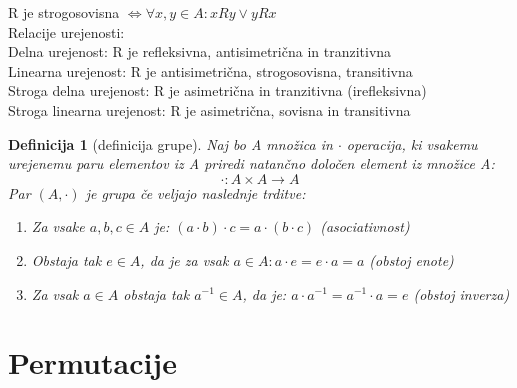 \documentclass[a4paper, 12pt]{book}
\newtheorem{definicija}{Definicija}[chapter]
\begin{document}
R je strogosovisna $\Leftrightarrow \forall x,y\in A: xRy \lor yRx $\\
Relacije urejenosti: \\
Delna urejenost: R je refleksivna, antisimetrična in tranzitivna \\
Linearna urejenost: R je antisimetrična, strogosovisna, transitivna \\ 
Stroga delna urejenost: R je asimetrična in tranzitivna (irefleksivna)  \\
Stroga linearna urejenost: R je asimetrična, sovisna in transitivna  \\


\begin{definicija}[definicija grupe]
    Naj bo A množica in $\cdot$ operacija, ki vsakemu urejenemu paru elementov iz A priredi natančno določen element iz množice A:
    \[
        \cdot:A \times A \rightarrow A 
    \]
    Par $(A, \cdot)$ je grupa če veljajo naslednje trditve:
    \begin{enumerate}
        \item Za vsake $a, b, c \in A$ je: $(a \cdot b) \cdot c = a \cdot (b \cdot c)$ (asociativnost)
        \item Obstaja tak $e \in A$, da je za vsak $a \in A: a \cdot e = e \cdot a = a$ (obstoj enote)
        \item Za vsak $a \in A$ obstaja tak $a^{-1} \in A$, da je: $a \cdot a^{-1} = a^{-1} \cdot a = e$ (obstoj inverza)
        
    \end{enumerate}
\end{definicija}

\chapter{ Permutacije }
\end{document}
